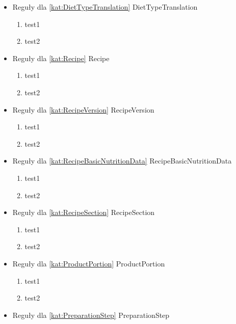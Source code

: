 \begin{itemize}[label={}]
    \item Reguły dla \ref{kat:DietTypeTranslation} DietTypeTranslation
    \begin{enumerate}[label={\textbf{REG/\protect\threedigits{\arabic{enumi}}}}, wide, labelwidth=!, resume]
        \item test1
        \item test2
    \end{enumerate}
    \item Reguły dla \ref{kat:Recipe} Recipe
    \begin{enumerate}[label={\textbf{REG/\protect\threedigits{\arabic{enumi}}}}, wide, labelwidth=!, resume]
        \item test1
        \item test2
    \end{enumerate}
    \item Reguły dla \ref{kat:RecipeVersion} RecipeVersion
    \begin{enumerate}[label={\textbf{REG/\protect\threedigits{\arabic{enumi}}}}, wide, labelwidth=!, resume]
        \item test1
        \item test2
    \end{enumerate}
    \item Reguły dla \ref{kat:RecipeBasicNutritionData} RecipeBasicNutritionData
    \begin{enumerate}[label={\textbf{REG/\protect\threedigits{\arabic{enumi}}}}, wide, labelwidth=!, resume]
        \item test1
        \item test2
    \end{enumerate}
    \item Reguły dla \ref{kat:RecipeSection} RecipeSection
    \begin{enumerate}[label={\textbf{REG/\protect\threedigits{\arabic{enumi}}}}, wide, labelwidth=!, resume]
        \item test1
        \item test2
    \end{enumerate}
    \item Reguły dla \ref{kat:ProductPortion} ProductPortion
    \begin{enumerate}[label={\textbf{REG/\protect\threedigits{\arabic{enumi}}}}, wide, labelwidth=!, resume]
        \item test1
        \item test2
    \end{enumerate}
    \item Reguły dla \ref{kat:PreparationStep} PreparationStep

\end{itemize}
